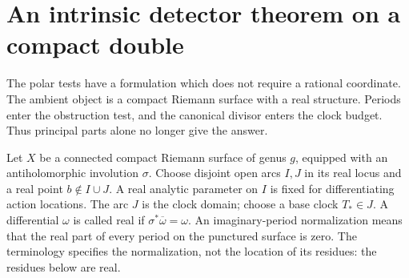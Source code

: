 \section{An intrinsic detector theorem on a compact double}
\label{sec:v86-meromorphic}
The polar tests have a formulation which does not require a rational
coordinate. The ambient object is a compact Riemann surface with a real
structure. Periods enter the obstruction test, and the canonical divisor
enters the clock budget. Thus principal parts alone no longer give the
answer.

Let $X$ be a connected compact Riemann surface of genus $g$, equipped
with an antiholomorphic involution $\sigma$. Choose disjoint open arcs
$I,J$ in its real locus and a real point $b\notin I\cup J$. A real
analytic parameter on $I$ is fixed for differentiating action locations.
The arc $J$ is the clock domain; choose a base clock $T_*\in J$.
A differential $\omega$ is called real if
$\sigma^*\overline\omega=\omega$. An imaginary-period normalization
means that the real part of every period on the punctured surface is
zero. The terminology specifies the normalization, not the location of
its residues: the residues below are real.

